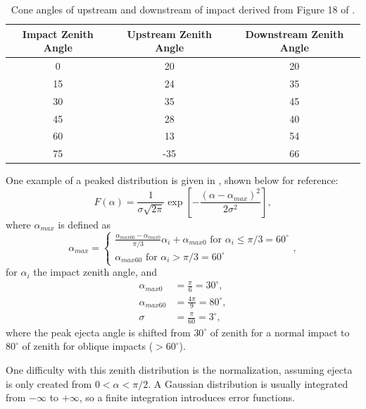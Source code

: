\documentclass{article}
\begin{document}
\begin{table}[h]\centering
	\caption{Cone angles of upstream and downstream of impact derived from Figure 18 of \cite{gault1978experimental}.}\label{tab:upstream_downstream_angles}
	\begin{tabular}{|c | c | c |}\hline
		Impact Zenith Angle & Upstream Zenith Angle & Downstream Zenith Angle\\\hline
		0	&20	&20\\\hline
		15	&24	&35\\\hline
		30	&35	&45\\\hline
		45	&28	&40\\\hline
		60	&13	&54\\\hline
		75	&-35	&66\\\hline		
	\end{tabular}
\end{table}


One example of a peaked distribution is given in \cite{rival1999modeling}, shown below for reference:
\begin{equation}\label{eq:Rival_zenith-dist}
F(\alpha) = \frac{1}{\sigma\sqrt{2\pi}}\exp\left[-\frac{(\alpha-\alpha_{max})^2}{2\sigma^2}\right],
\end{equation}
where $\alpha_{max}$ is defined as
\begin{equation}
\alpha_{max} = 
\begin{cases}
\frac{\alpha_{max60}-\alpha_{max0}}{\pi/3}\alpha_i + \alpha_{max0}\text{  for $\alpha_i\le \pi/3 = 60^\circ$}\\
\alpha_{max60}\text{  for $\alpha_i > \pi/3 = 60^\circ$}
\end{cases},
\end{equation}
for $\alpha_i$ the impact zenith angle, and \citep[see][]{ESABASE2_DebrisRelease10.0}
\begin{align}
\alpha_{max0} &= \frac{\pi}{6} = 30^\circ,\\
\alpha_{max60} &= \frac{4\pi}{9} = 80^\circ,\\
\sigma &= \frac{\pi}{60} = 3^\circ,
\end{align}
where the peak ejecta angle is shifted from $30^\circ$ of zenith for a normal impact to $80^\circ$ of zenith for oblique impacts ($>60^\circ$).

One difficulty with this zenith distribution is the normalization, assuming ejecta is only created from $0 < \alpha < \pi/2 $. A Gaussian distribution is usually integrated from $-\infty$ to $+\infty$, so a finite integration introduces error functions.
\end{document}
